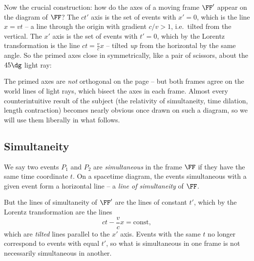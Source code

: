 Now the crucial construction: how do the axes of a moving frame $\FF'$ appear on the diagram of $\FF$? The $ct'$ axis is the set of events with $x' = 0$, which is the line $x = vt$ -- a line through the origin with gradient $c/v > 1$, i.e.\ tilted from the vertical. The $x'$ axis is the set of events with $t' = 0$, which by the Lorentz transformation is the line $ct = \frac{v}{c}x$ -- tilted \emph{up} from the horizontal by the same angle. So the primed axes close in symmetrically, like a pair of scissors, about the $45\dg$ light ray:

\begin{center}
\end{center}

The primed axes are \emph{not} orthogonal on the page -- but both frames agree on the world lines of light rays, which bisect the axes in each frame. Almost every counterintuitive result of the subject (the relativity of simultaneity, time dilation, length contraction) becomes nearly obvious once drawn on such a diagram, so we will use them liberally in what follows.

\subsection{Simultaneity}

We say two events $P_1$ and $P_2$ are \emph{simultaneous} in the frame $\FF$ if they have the same time coordinate $t$. On a spacetime diagram, the events simultaneous with a given event form a horizontal line -- a \emph{line of simultaneity} of $\FF$.

But the lines of simultaneity of $\FF'$ are the lines of constant $t'$, which by the Lorentz transformation are the lines
$$
ct - \frac{v}{c}x = \text{const},
$$
which are \emph{tilted} lines parallel to the $x'$ axis. Events with the same $t$ no longer correspond to events with equal $t'$, so what is simultaneous in one frame is not necessarily simultaneous in another.

\begin{center}
\end{center}


